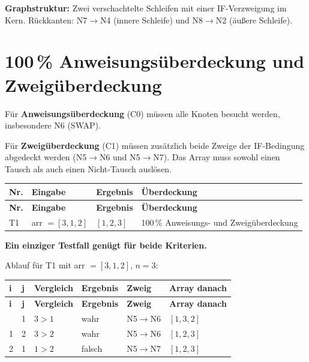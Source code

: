 \documentclass[
	fontsize=12pt,          %
	paper=a4,               %
	numbers=noenddot,       %
	listof=totoc,           %
	listof=entryprefix,     %
	listof=nochaptergap,    %
	bibliography=totoc,     %
	parskip=half,           %
	openany                 %
]{scrbook}
\begin{document}
\textbf{Graphstruktur:}
Zwei verschachtelte Schleifen mit einer IF-Verzweigung im Kern.
Rückkanten: N7$\to$N4 (innere Schleife) und N8$\to$N2 (äußere Schleife).

\section*{100\,\% Anweisungsüberdeckung und Zweigüberdeckung}

Für \textbf{Anweisungsüberdeckung} (C0) müssen alle Knoten besucht werden, insbesondere N6 (SWAP).

Für \textbf{Zweigüberdeckung} (C1) müssen zusätzlich beide Zweige der IF-Bedingung abgedeckt werden (N5$\to$N6 und N5$\to$N7).
Das Array muss sowohl einen Tausch als auch einen Nicht-Tausch auslösen.

\begin{longtable}{| p{0.5cm} | p{2.5cm} | p{2.5cm} | p{5.5cm} |}
	\hline
	\textbf{Nr.} & \textbf{Eingabe} & \textbf{Ergebnis} & \textbf{Überdeckung} \\ \hline
	\endfirsthead
	\hline
	\textbf{Nr.} & \textbf{Eingabe} & \textbf{Ergebnis} & \textbf{Überdeckung} \\ \hline
	\endhead
	\hline
	\endfoot
	T1 & arr $= [3, 1, 2]$ & $[1, 2, 3]$ & 100\,\% Anweisungs- und Zweigüberdeckung \\ \hline
\end{longtable}

\textbf{Ein einziger Testfall genügt für beide Kriterien.}

Ablauf für T1 mit arr $= [3, 1, 2]$, $n = 3$:

\begin{longtable}{| p{0.5cm} | p{0.5cm} | p{3.0cm} | p{2.5cm} | p{2.0cm} | p{2.5cm} |}
	\hline
	\textbf{i} & \textbf{j} & \textbf{Vergleich} & \textbf{Ergebnis} & \textbf{Zweig} & \textbf{Array danach} \\ \hline
	\endfirsthead
	\hline
	\textbf{i} & \textbf{j} & \textbf{Vergleich} & \textbf{Ergebnis} & \textbf{Zweig} & \textbf{Array danach} \\ \hline
	\endhead
	\hline
	\endfoot
	1 & 1 & $3 > 1$ & wahr & N5$\to$N6 & $[1, 3, 2]$ \\ \hline
	1 & 2 & $3 > 2$ & wahr & N5$\to$N6 & $[1, 2, 3]$ \\ \hline
	2 & 1 & $1 > 2$ & falsch & N5$\to$N7 & $[1, 2, 3]$ \\ \hline
\end{longtable}
\end{document}
